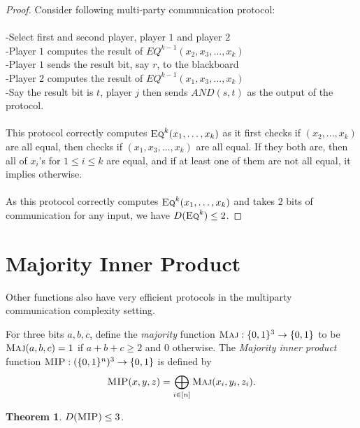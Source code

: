 \documentclass[11pt,oneside]{book}
\theoremstyle{plain}
\newtheorem{theorem}{Theorem}
\theoremstyle{definition}
\theoremstyle{plain}
\newcommand{\Eq}{\textsc{Eq}}
\newcommand{\Maj}{\textsc{Maj}}
\newcommand{\MIP}{\textsc{MIP}}
\begin{document}
	\begin{proof}
		Consider following multi-party communication protocol:\\
		\\
		-Select first and second player, player $1$ and player $2$\\
		-Player $1$ computes the result of $EQ^{k-1}(x_2,x_3,...,x_k)$\\
		-Player $1$ sends the result bit, say $r$, to the blackboard\\
		-Player $2$ computes the result of $EQ^{k-1}(x_1,x_3,...,x_k)$\\
		-Say the result bit is $t$, player $j$ then sends $AND(s,t)$ as the output of the protocol.\\
		\\
		This protocol correctly computes $\Eq^k(x_1,\ldots,x_k)$ as it first checks if $(x_2,...,x_k)$ are all equal, then checks if $(x_1,x_3,...,x_k)$ are all equal. If they both are, then all of $x_i$'s for $1 \leq i \leq k$ are equal, and if at least one of them are not all equal, it implies otherwise. \\
		\\
		As this protocol correctly computes $\Eq^k(x_1,\ldots,x_k)$ and takes $2$ bits of communication for any input, we have  $D(\Eq^k) \le 2$. 
	\end{proof}
	
	
	
	 
	\section{Majority Inner Product}
	
	Other functions also have very efficient protocols in the multiparty communication complexity setting. 
	
	For three bits $a,b,c$, define the \emph{majority} function $\Maj : \{0,1\}^3 \to \{0,1\}$ to be $\Maj(a,b,c) = 1$ if $a+b+c \ge 2$ and $0$ otherwise. The \emph{Majority inner product} function $\MIP : (\{0,1\}^n)^3 \to \{0,1\}$ is defined by
	\[
	\MIP(x,y,z) = \bigoplus_{i \in [n]} \Maj(x_i,y_i,z_i).
	\]
	\begin{theorem}
		$D(\MIP) \le 3$.
	\end{theorem}
	
\end{document}
